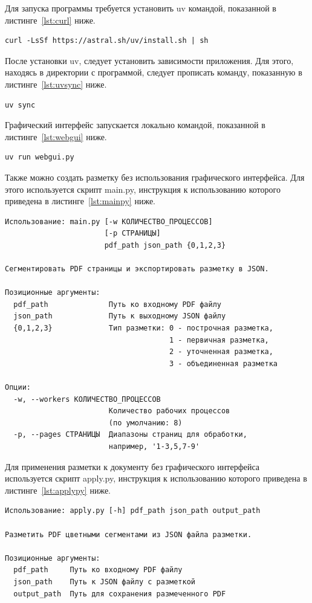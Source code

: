 Для запуска программы требуется установить uv командой, показанной в листинге~\ref{lst:curl} ниже.
\begin{lstlisting}[caption={Установка uv}, label={lst:curl}]
curl -LsSf https://astral.sh/uv/install.sh | sh
\end{lstlisting}

После установки uv, следует установить зависимости приложения.
Для этого, находясь в директории с программой, следует прописать команду, показанную в листинге~\ref{lst:uvsync} ниже.
\begin{lstlisting}[caption={Установка зависимостей}, label={lst:uvsync}]
uv sync
\end{lstlisting}

Графический интерфейс запускается локально командой, показанной в листинге~\ref{lst:webgui} ниже.
\begin{lstlisting}[caption={Запуск графического веб-интерфейса}, label={lst:webgui}]
uv run webgui.py
\end{lstlisting}

Также можно создать разметку без использования графического интерфейса.
Для этого используется скрипт main.py, инструкция к использованию которого приведена в листинге~\ref{lst:mainpy} ниже.

\newpage

\begin{lstlisting}[caption={Запуск скрипта для создания разметки}, label={lst:mainpy}]
Использование: main.py [-w КОЛИЧЕСТВО_ПРОЦЕССОВ]
                       [-p СТРАНИЦЫ]
                       pdf_path json_path {0,1,2,3}

Сегментировать PDF страницы и экспортировать разметку в JSON.

Позиционные аргументы:
  pdf_path              Путь ко входному PDF файлу
  json_path             Путь к выходному JSON файлу
  {0,1,2,3}             Тип разметки: 0 - построчная разметка,
                                      1 - первичная разметка,
                                      2 - уточненная разметка,
                                      3 - объединенная разметка

Опции:
  -w, --workers КОЛИЧЕСТВО_ПРОЦЕССОВ
                        Количество рабочих процессов
                        (по умолчанию: 8)
  -p, --pages СТРАНИЦЫ  Диапазоны страниц для обработки,
                        например, '1-3,5,7-9'
\end{lstlisting}

Для применения разметки к документу без графического интерфейса используется скрипт apply.py, инструкция к использованию которого приведена в листинге~\ref{lst:applypy} ниже.
\begin{lstlisting}[caption={Запуск скрипта для применения разметки к PDF документу}, label={lst:applypy}]
Использование: apply.py [-h] pdf_path json_path output_path

Разметить PDF цветными сегментами из JSON файла разметки.

Позиционные аргументы:
  pdf_path     Путь ко входному PDF файлу
  json_path    Путь к JSON файлу с разметкой
  output_path  Путь для сохранения размеченного PDF
\end{lstlisting}

